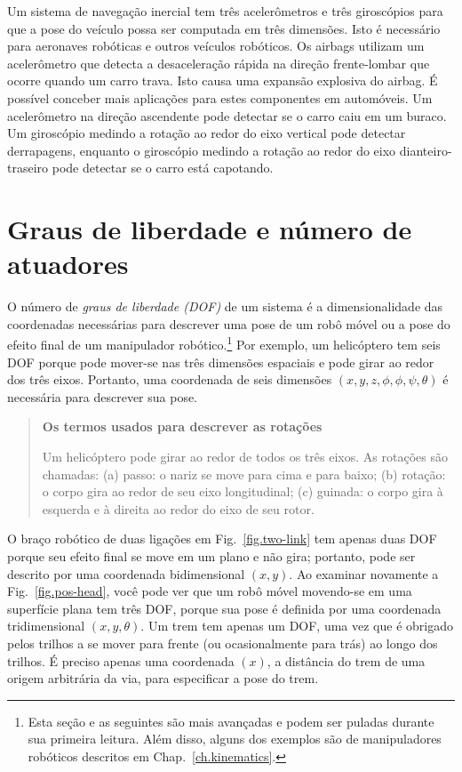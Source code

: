 Um sistema de navegação inercial tem três acelerômetros e três giroscópios para que a pose do veículo possa ser computada em três dimensões. Isto é necessário para aeronaves robóticas e outros veículos robóticos. Os airbags utilizam um acelerômetro que detecta a desaceleração rápida na direção frente-lombar que ocorre quando um carro trava. Isto causa uma expansão explosiva do airbag. É possível conceber mais aplicações para estes componentes em automóveis. Um acelerômetro na direção ascendente pode detectar se o carro caiu em um buraco. Um giroscópio medindo a rotação ao redor do eixo vertical pode detectar derrapagens, enquanto o giroscópio medindo a rotação ao redor do eixo dianteiro-traseiro pode detectar se o carro está capotando.


\section{Graus de liberdade e número de atuadores}\label{s.dof}

O número de \emph{graus de liberdade (DOF)} de um sistema é a dimensionalidade das coordenadas necessárias para descrever uma pose de um robô móvel ou a pose do efeito final de um manipulador robótico.\footnote{Esta seção e as seguintes são mais avançadas e podem ser puladas durante sua primeira leitura. Além disso, alguns dos exemplos são de manipuladores robóticos descritos em Chap.~\ref{ch.kinematics}.} Por exemplo, um helicóptero tem seis DOF porque pode mover-se nas três dimensões espaciais e pode girar ao redor dos três eixos. Portanto, uma coordenada de seis dimensões $(x,y,z,\phi,\phi,\psi,\theta)$ é necessária para descrever sua pose.

\begin{quote}
\begin{center}
\textbf{Os termos usados para descrever as rotações}
\end{center}
Um helicóptero pode girar ao redor de todos os três eixos. As rotações são chamadas: (a) passo: o nariz se move para cima e para baixo; (b) rotação: o corpo gira ao redor de seu eixo longitudinal; (c) guinada: o corpo gira à esquerda e à direita ao redor do eixo de seu rotor.
\end{quote}

O braço robótico de duas ligações em Fig.~\ref{fig.two-link} tem apenas duas DOF porque seu efeito final se move em um plano e não gira; portanto, pode ser descrito por uma coordenada bidimensional $(x,y)$. Ao examinar novamente a Fig.~\ref{fig.pos-head}, você pode ver que um robô móvel movendo-se em uma superfície plana tem três DOF, porque sua pose é definida por uma coordenada tridimensional $(x,y,\theta)$. Um trem tem apenas um DOF, uma vez que é obrigado pelos trilhos a se mover para frente (ou ocasionalmente para trás) ao longo dos trilhos. É preciso apenas uma coordenada $(x)$, a distância do trem de uma origem arbitrária da via, para especificar a pose do trem.

